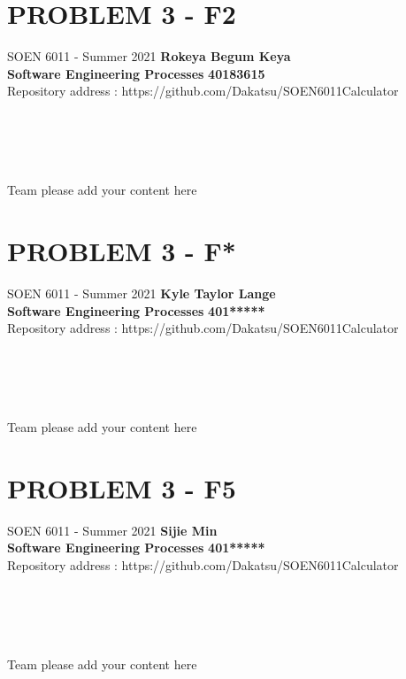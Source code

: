 \documentclass[a4paper, 11pt]{report}
\begin{document}
\noindent
\section*{PROBLEM 3 - F2}
\normalsize {SOEN 6011 - Summer 2021} \hfill \textbf{Rokeya Begum Keya} \\
\textbf{ Software Engineering Processes}  \hfill \textbf{40183615} \\
\hfill Repository address : https://github.com/Dakatsu/SOEN6011Calculator
\\\\\\\\\\
 \begin{center} Team please add your content here \end{center}
\pagebreak

\section*{PROBLEM 3 - F*}
\normalsize {SOEN 6011 - Summer 2021} \hfill \textbf{Kyle Taylor Lange} \\
\textbf{ Software Engineering Processes}  \hfill \textbf{401*****} \\
\hfill Repository address : https://github.com/Dakatsu/SOEN6011Calculator
\\\\\\\\\\
 \begin{center} Team please add your content here \end{center}
\pagebreak

\section*{PROBLEM 3 - F5}
\normalsize {SOEN 6011 - Summer 2021} \hfill \textbf{Sijie Min} \\
\textbf{ Software Engineering Processes}  \hfill \textbf{401*****} \\
\hfill Repository address : https://github.com/Dakatsu/SOEN6011Calculator
\\\\\\\\\\
 \begin{center} Team please add your content here \end{center}
\pagebreak
\end{document}
